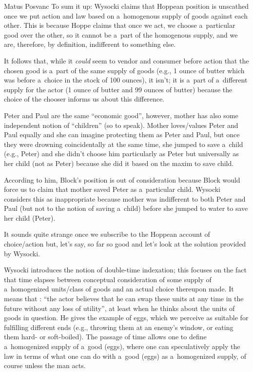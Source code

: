 \begin{artengenv}{Matus Posvanc}
To sum it up: Wysocki claims that Hoppean position is unscathed once we put action and law based on a~homogenous supply of goods against each other. This is because Hoppe claims that once we act, we choose a~particular good over the other, so it cannot be a~part of the homogenous supply, and we are, therefore, by definition, indifferent to something else.



It follows that, while it \textit{could} seem to vendor and consumer before action that the chosen good is a~part of the same supply of goods (e.g., 1 ounce of butter which was before a~choice in the stock of 100 ounces), it isn't; it is a~part of a~different supply for the actor (1 ounce of butter and 99 ounces of butter) because the choice of the chooser informs us about this difference.



Peter and Paul are the same ``economic good'', however, mother has also some independent notion of ``children'' (so to speak). Mother loves/values Peter and Paul equally and she can imagine protecting them as Peter and Paul, but once they were drowning coincidentally at the same time, she jumped to save a~child (e.g., Peter) and she didn't choose him particularly as Peter but universally as her child (not as Peter) because she did it based on the maxim to save child.



According to him, Block's position is out of consideration because Block would force us to claim that mother saved Peter as a~particular child. Wysocki considers this as inappropriate because mother was indifferent to both Peter and Paul (but not to the notion of saving a~child) before she jumped to water to save her child (Peter).



It sounds quite strange once we subscribe to the Hoppean account of choice/action but, let's say, so far so good and let's look at the solution provided by Wysocki.



Wysocki introduces the notion of double-time indexation; this focuses on the fact that time elapses between conceptual consideration of some supply of a~homogenized units/class of goods and an actual choice thereupon made. It means that 
\parencite[][p.39]{Wysocki2021problem}: %
 ``the actor believes that he can swap these units at any time in the future without any loss of utility'', at least when he thinks about the units of goods in question. He gives the example of eggs, which we perceive as suitable for fulfilling different ends (e.g., throwing them at an enemy's window, or eating them hard- or soft-boiled). The passage of time allows one to define a~homogenized supply of a~good (eggs), where one can speculatively apply the law in terms of what one can do with a~good (eggs) as a~homogenized supply, of course unless the man acts.




\end{artengenv}
